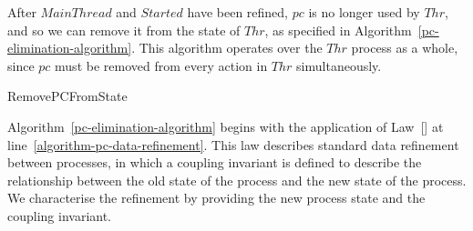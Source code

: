 After $MainThread$ and $Started$ have been refined, $pc$ is no longer
used by $Thr$, and so we can remove it from the state of $Thr$, as
specified in Algorithm~\ref{pc-elimination-algorithm}.
This algorithm operates over the $Thr$ process as a whole, since $pc$
must be removed from every action in $Thr$ simultaneously.

\begin{algorithm}
  \begin{algorithmic}[1]
    \State {}
    \label{algorithm-pc-data-refinement}
    \State {}
    \label{algorithm-eliminate-Skips}
    \State {}
    \label{algorithm-eliminate-bc-parameter}
  \end{algorithmic}
  \caption{RemovePCFromState}
  \label{pc-elimination-algorithm}
\end{algorithm}

Algorithm~\ref{pc-elimination-algorithm} begins with the application
of Law~[] at
line~\ref{algorithm-pc-data-refinement}.
This law describes standard \Circus{} data refinement between
processes, in which a coupling invariant is defined to describe the
relationship between the old state of the process and the new state of
the process.
We characterise the refinement by providing the new process state and
the coupling invariant.

